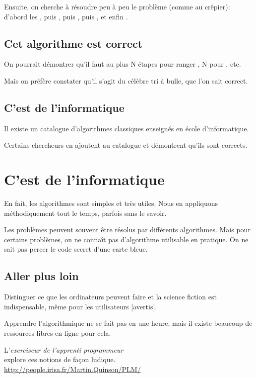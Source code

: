 \documentclass[a7paper,pagesize,DIV=14,10pt]{scrbook}
\begin{document}
Ensuite, on cherche à résoudre peu à peu le problème (comme au
crêpier): d'abord les , puis , puis ,
puis , et enfin .

\vspace{-.8\baselineskip}
\subsection*{Cet algorithme est correct}
\vspace{-.5\baselineskip}

On pourrait démontrer qu'il faut au plus N étapes pour ranger
, N pour , etc.

Mais on préfère constater qu'il s'agit du célèbre tri à bulle, que
l'on sait correct.

\vspace{-.8\baselineskip}
\subsection*{C'est de l'informatique}
\vspace{-.5\baselineskip}

Il existe un catalogue d'algorithmes classiques enseignés en école
d'informatique.

Certains chercheurs en ajoutent au catalogue et démontrent qu'ils
sont corrects.


\newpage
\section*{C'est de l'informatique}
\vspace{-.5\baselineskip} %
En fait, les algorithmes sont simples et très utiles. Nous en
appliquons méthodiquement tout le temps, parfois sans le savoir.

Les problèmes peuvent souvent être résolus par différents algorithmes.
Mais pour certains problèmes, on ne connaît pas d'algorithme
utilisable en pratique. On ne sait pas percer le code secret d'une
carte bleue.

\vspace{-.5\baselineskip} %
\subsection*{Aller plus loin}
\vspace{-.5\baselineskip} %
Distinguer ce que les ordinateurs peuvent faire et la science fiction
est indispensable, même pour les utilisateurs [avertis].

Apprendre l'algorithmique ne se fait pas en une heure, mais il existe
beaucoup de ressources libres en ligne pour cela.

L'\textit{exerciseur de l'apprenti programmeur}\\ explore
ces notions de façon ludique.\\
{\small\color{blue}\url{http://people.irisa.fr/Martin.Quinson/PLM/}}
\end{document}
